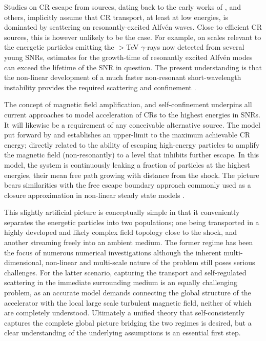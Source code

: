 \documentclass[a4paper,fleqn,usenatbib]{mnras}
\newcommand\comment[1]{{#1}}
\begin{document}
Studies on CR escape from sources, dating back to the early works of \citet{KulsrudCesarsky71}, \citet{Skilling71} and others, implicitly assume that CR transport, at least at low energies, is dominated by scattering on resonantly-excited Alfv\'en waves.  Close to efficient CR sources, this is however unlikely to be the case. For example, on scales relevant to the energetic particles emitting the $>$TeV $\gamma$-rays now detected from several young SNRs, estimates for the growth-time of resonantly excited Alfv\'en modes can exceed the lifetime of the SNR in question. The present understanding is that the non-linear development of a much faster non-resonant short-wavelength instability provides the required scattering and confinement \citep{Bell04,Bell13}. 

The concept of magnetic field amplification, and self-confinement underpins all current approaches to model acceleration of CRs to the highest energies in SNRs. It will likewise be a requirement of any conceivable alternative source. The model put forward by \cite{ZirakashviliPtuskin} and \cite{Bell13} establishes an upper-limit to the maximum achievable CR energy; directly related to the ability of escaping high-energy particles to amplify the magnetic field (non-resonantly) to a level that inhibits further escape. In this model, the system is continuously leaking a fraction of particles at the highest energies, their mean free path growing with distance from the shock. The picture bears similarities with the free escape boundary approach commonly used as a closure approximation in non-linear steady state models \cite[e.g.][]{EllisonEichler, Reville09}. 

\comment{This slightly artificial picture is conceptually simple in that it conveniently separates the energetic particles into two populations; one being transported in a highly developed and likely complex field topology close to the shock, and another streaming freely into an ambient medium. 
The former regime has been the focus of numerous numerical investigations \cite[e.g.][]{Bell04,Zirakashvili,Reville08,Gargate,Rogachevskii,Reville13,Baietal15, Marret} although the inherent multi-dimensional, non-linear and multi-scale nature of the problem still poses serious challenges. 
For the latter scenario, capturing the transport and self-regulated scattering in the immediate surrounding medium is an equally challenging problem, as an accurate model demands connecting the global structure of the accelerator with the local large scale turbulent magnetic field, neither of which are completely understood. Ultimately a unified theory that self-consistently captures the complete global picture bridging the two regimes is desired, but a clear understanding of the underlying assumptions is an essential first step.}
\end{document}
